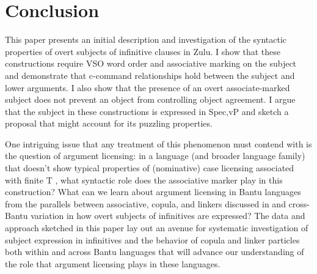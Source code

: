 \documentclass[output=paper,colorlinks,citecolor=brown]{langscibook}
\begin{document}
\section{Conclusion}\label{sec:halpert:5}

This paper presents an initial description and investigation of the syntactic properties of overt subjects of infinitive clauses in Zulu.  I show that these constructions require VSO word order and associative marking on the subject and demonstrate that c-command relationships hold between the subject and lower arguments. I also show that the presence of an overt associate-marked subject does not prevent an object from controlling object agreement.  I argue that the subject in these constructions is expressed in Spec,vP and sketch a proposal that might account for its puzzling properties. 

One intriguing issue that any treatment of this phenomenon must contend with is the question of argument licensing: in a language (and broader language family) that doesn't show typical properties of (nominative) case licensing associated with finite T \citep{Diercks2012,Halpert2015}, what syntactic role does the associative marker play in this construction? What can we learn about argument licensing in Bantu languages from the parallels between associative, copula, and linkers discussed in  and cross-Bantu variation in how overt subjects of infinitives are expressed? The data and approach sketched in this paper lay out an avenue for systematic investigation of subject expression in infinitives and the behavior of copula and linker particles both within and across Bantu languages that will advance our understanding of the role that argument licensing plays in these languages.

\end{document}
